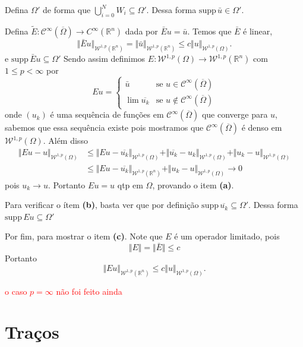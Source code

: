 \documentclass[a4paper, 11pt]{book}
\theoremstyle{definition}
\newcommand{\bR}{\mathbb{R}}
\newcommand{\cC}{\mathcal{C}}
\newcommand{\cW}{\mathcal{W}}
\newcommand{\supp}{\mathrm{supp}\,}
\begin{document}
\begin{prf}
    Defina $\Omega'$ de forma que $\bigcup_{i=0}^N W_i \subseteq \Omega'$.
    Dessa forma $\supp \bar u \in \Omega'$.
    
    Defina $\tilde E: \cC^\infty(\overline\Omega) \to C^\infty(\bR^n)$ dada por $\bar E u = \bar u$.
    Temos que $\bar E$ é linear,
    \[
        \Vert \bar E u \Vert_{\cW^{1,p}(\bR^n)} = \Vert \bar u \Vert_{\cW^{1,p}(\bR^n)} \leqslant c \Vert u \Vert_{\cW^{1,p}(\Omega)}.
    \]
    e $\supp \bar E u \subseteq \Omega'$
    Sendo assim definimos $E : \cW^{1,p}(\Omega) \to \cW^{1,p}(\bR^n)$ com $1 \leqslant p < \infty$ por
    \[
        E u = 
        \left\{ 
            \begin{array}{ll}
                \bar u & \text{se } u \in \cC^\infty(\overline \Omega)\\
                \lim \overline {u_k} &\text{se } u \not\in \cC^\infty(\overline\Omega)
            \end{array}
        \right.
    \]
    onde $(u_k)$ é uma sequência de funções em $\cC^\infty(\overline\Omega)$ que converge para $u$, sabemos que essa sequência existe pois mostramos que $\cC^\infty(\overline\Omega)$ é denso em $\cW^{1,p}(\Omega)$.
    Além disso
    \[
        \begin{aligned}
            \Vert Eu - u \Vert_{\cW^{1,p}(\Omega)} &\leqslant \Vert Eu - \overline{u_k} \Vert_{\cW^{1,p}(\Omega)} + \Vert \overline{u_k} - u_k \Vert_{\cW^{1,p}(\Omega)} + \Vert u_k - u\Vert_{\cW^{1,p}(\Omega)}\\
            &\leqslant \Vert Eu - \overline{u_k} \Vert_{\cW^{1,p}(\bR^n)} + \Vert u_k - u \Vert_{\cW^{1,p}(\Omega)} \to 0
        \end{aligned}
    \]
    pois $u_k \to u$.
    Portanto $Eu = u$ qtp em $\Omega$, provando o item \textbf{(a)}.

    Para verificar o ítem \textbf{(b)}, basta ver que por definição $\supp \overline{u_k} \subseteq \Omega'$.
    Dessa forma $\supp Eu \subseteq \Omega'$

    Por fim, para mostrar o item \textbf{(c)}.
    Note que $E$ é um operador limitado, pois
    \[
        \Vert E \Vert = \Vert \bar E \Vert \leqslant c
    \]
    Portanto
    \[
        \Vert Eu \Vert_{\cW^{1,p}(\bR^n)} \leqslant c \Vert u \Vert_{\cW^{1,p}(\Omega)}.
    \]

    \textcolor{red}{o caso $p = \infty$ não foi feito ainda} 
\end{prf}

\section{Traços}
\end{document}
